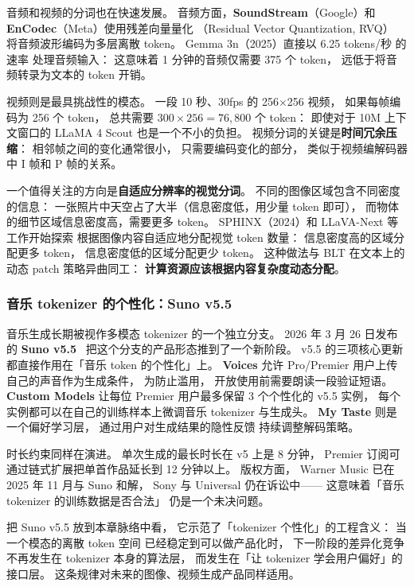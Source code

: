 音频和视频的分词也在快速发展。
音频方面，\textbf{SoundStream}（Google）和
\textbf{EnCodec}（Meta）使用残差向量量化
（Residual Vector Quantization, RVQ）
将音频波形编码为多层离散 token。
Gemma 3n（2025）直接以 6.25 tokens/秒 的速率
处理音频输入：
这意味着 1 分钟的音频仅需要 375 个 token，
远低于将音频转录为文本的 token 开销。

视频则是最具挑战性的模态。
一段 10 秒、30fps 的 256$\times$256 视频，
如果每帧编码为 256 个 token，
总共需要 $300 \times 256 = 76{,}800$ 个 token：
即使对于 10M 上下文窗口的 LLaMA 4 Scout
也是一个不小的负担。
视频分词的关键是\textbf{时间冗余压缩}：
相邻帧之间的变化通常很小，
只需要编码变化的部分，
类似于视频编解码器中 I 帧和 P 帧的关系。

一个值得关注的方向是\textbf{自适应分辨率的视觉分词}。
不同的图像区域包含不同密度的信息：
一张照片中天空占了大半（信息密度低，用少量 token 即可），
而物体的细节区域信息密度高，需要更多 token。
SPHINX（2024）和 LLaVA-Next 等工作开始探索
根据图像内容自适应地分配视觉 token 数量：
信息密度高的区域分配更多 token，
信息密度低的区域分配更少 token。
这种做法与 BLT 在文本上的动态 patch 策略异曲同工：
\textbf{计算资源应该根据内容复杂度动态分配}。

\subsubsection{音乐 tokenizer 的个性化：Suno v5.5}

音乐生成长期被视作多模态 tokenizer 的一个独立分支。
2026 年 3 月 26 日发布的 \textbf{Suno v5.5}~\cite{suno2026v55}
把这个分支的产品形态推到了一个新阶段。
v5.5 的三项核心更新都直接作用在「音乐 token 的个性化」上。
\textbf{Voices} 允许 Pro/Premier 用户上传自己的声音作为生成条件，
为防止滥用，
开放使用前需要朗读一段验证短语。
\textbf{Custom Models} 让每位 Premier 用户最多保留 3 个个性化的 v5.5 实例，
每个实例都可以在自己的训练样本上微调音乐 tokenizer 与生成头。
\textbf{My Taste} 则是一个偏好学习层，
通过用户对生成结果的隐性反馈
持续调整解码策略。

时长约束同样在演进。
单次生成的最长时长在 v5 上是 8 分钟，
Premier 订阅可通过链式扩展把单首作品延长到 12 分钟以上。
版权方面，
Warner Music 已在 2025 年 11 月与 Suno 和解，
Sony 与 Universal 仍在诉讼中——
这意味着「音乐 tokenizer 的训练数据是否合法」
仍是一个未决问题。

把 Suno v5.5 放到本章脉络中看，
它示范了「tokenizer 个性化」的工程含义：
当一个模态的离散 token 空间
已经稳定到可以做产品化时，
下一阶段的差异化竞争
不再发生在 tokenizer 本身的算法层，
而发生在「让 tokenizer 学会用户偏好」的接口层。
这条规律对未来的图像、视频生成产品同样适用。


